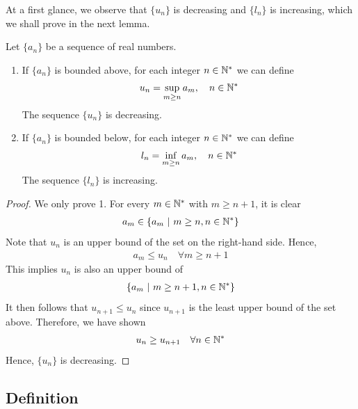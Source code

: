 \documentclass[thmcnt=section, 12pt]{my-elegantbook}
\begin{document}
At a first glance, we observe that $\{u_n\}$ is decreasing and $\{l_n\}$ is increasing, which we shall prove in the next lemma.

\begin{lemma} \label{lem:5}
    Let $\{a_n\}$ be a sequence of real numbers.
    \begin{enumerate}
        \item If $\{a_n\}$ is bounded above, for each integer $n \in \mathbb{N}^\ast$ we can define
              \begin{align*}
                  u_n = \sup_{m \geq n} a_m,
                  \quad n \in \mathbb{N}^\ast
              \end{align*}
              The sequence $\{u_n\}$ is decreasing.
        \item If $\{a_n\}$ is bounded below, for each integer $n \in \mathbb{N}^\ast$ we can define
              \begin{align*}
                  l_n = \inf_{m \geq n} a_m,
                  \quad n \in \mathbb{N}^\ast
              \end{align*}
              The sequence $\{l_n\}$ is increasing.
    \end{enumerate}
\end{lemma}

\begin{proof}
    We only prove 1. For every $m \in \mathbb{N}^\ast$ with $m \geq n+1$, it is clear
    \begin{align*}
        a_{m} \in \left\{ a_m \ \middle| \ m \geq n, n \in \mathbb{N}^\ast \right\}
    \end{align*}
    Note that $u_n$ is an upper bound of the set on the right-hand side. Hence,
    \begin{align*}
        a_m \leq u_n
        \quad \forall m \geq n+1
    \end{align*}
    This implies $u_n$ is also an upper bound of
    \begin{align*}
        \left\{ a_m \ \middle| \ m \geq n+1, n \in \mathbb{N}^\ast \right\}
    \end{align*}
    It then follows that $u_{n+1} \leq u_n$ since $u_{n+1}$ is the least upper bound of the set above. Therefore, we have shown
    \begin{align*}
        u_{n} \geq u_{n+1}
        \quad \forall n \in \mathbb{N}^\ast
    \end{align*}
    Hence, $\{u_n\}$ is decreasing.
\end{proof}


\subsection{Definition}
\end{document}
